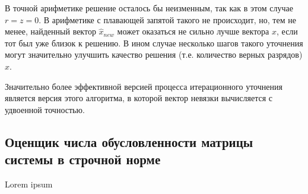 В точной арифметике решение осталось бы неизменным, так как в этом случае $r = z = 0$. В арифметике с плавающей запятой такого не происходит, но, тем не менее, найденный вектор $\hat{x}_{new}$ может оказаться не сильно лучше вектора $\hat{x}$, если тот был уже близок к решению. В ином случае несколько шагов такого уточнения могут значительно улучшить качество решения (т.е. количество верных разрядов) $\hat{x}$.

Значительно более эффективной версией процесса итерационного уточнения является версия этого алгоритма, в которой вектор невязки вычисляется с удвоенной точностью. 
\subsection{Оценщик числа обусловленности матрицы системы в строчной норме}

Lorem ipsum

